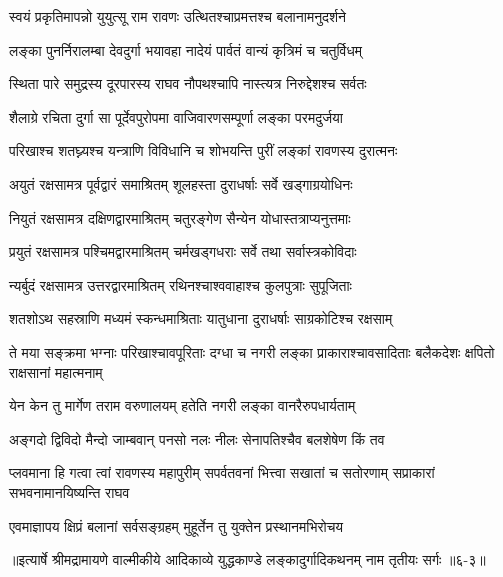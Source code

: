 \twolineshloka
{स्वयं प्रकृतिमापन्नो युयुत्सू राम रावणः}
{उत्थितश्चाप्रमत्तश्च बलानामनुदर्शने} %

\twolineshloka
{लङ्का पुनर्निरालम्बा देवदुर्गा भयावहा}
{नादेयं पार्वतं वान्यं कृत्रिमं च चतुर्विधम्} %

\twolineshloka
{स्थिता पारे समुद्रस्य दूरपारस्य राघव}
{नौपथश्चापि नास्त्यत्र निरुद्देशश्च सर्वतः} %

\twolineshloka
{शैलाग्रे रचिता दुर्गा सा पूर्देवपुरोपमा}
{वाजिवारणसम्पूर्णा लङ्का परमदुर्जया} %

\twolineshloka
{परिखाश्च शतघ्न्यश्च यन्त्राणि विविधानि च}
{शोभयन्ति पुरीं लङ्कां रावणस्य दुरात्मनः} %

\twolineshloka
{अयुतं रक्षसामत्र पूर्वद्वारं समाश्रितम्}
{शूलहस्ता दुराधर्षाः सर्वे खड्गाग्रयोधिनः} %

\twolineshloka
{नियुतं रक्षसामत्र दक्षिणद्वारमाश्रितम्}
{चतुरङ्गेण सैन्येन योधास्तत्राप्यनुत्तमाः} %

\twolineshloka
{प्रयुतं रक्षसामत्र पश्चिमद्वारमाश्रितम्}
{चर्मखड्गधराः सर्वे तथा सर्वास्त्रकोविदाः} %

\twolineshloka
{न्यर्बुदं रक्षसामत्र उत्तरद्वारमाश्रितम्}
{रथिनश्चाश्ववाहाश्च कुलपुत्राः सुपूजिताः} %

\twolineshloka
{शतशोऽथ सहस्राणि मध्यमं स्कन्धमाश्रिताः}
{यातुधाना दुराधर्षाः साग्रकोटिश्च रक्षसाम्} %

\threelineshloka
{ते मया सङ्क्रमा भग्नाः परिखाश्चावपूरिताः}
{दग्धा च नगरी लङ्का प्राकाराश्चावसादिताः}
{बलैकदेशः क्षपितो राक्षसानां महात्मनाम्} %

\twolineshloka
{येन केन तु मार्गेण तराम वरुणालयम्}
{हतेति नगरी लङ्का वानरैरुपधार्यताम्} %

\twolineshloka
{अङ्गदो द्विविदो मैन्दो जाम्बवान् पनसो नलः}
{नीलः सेनापतिश्चैव बलशेषेण किं तव} %

\threelineshloka
{प्लवमाना हि गत्वा त्वां रावणस्य महापुरीम्}
{सपर्वतवनां भित्त्वा सखातां च सतोरणाम्}
{सप्राकारां सभवनामानयिष्यन्ति राघव} %

\twolineshloka
{एवमाज्ञापय क्षिप्रं बलानां सर्वसङ्ग्रहम्}
{मुहूर्तेन तु युक्तेन प्रस्थानमभिरोचय} %


॥इत्यार्षे श्रीमद्रामायणे वाल्मीकीये आदिकाव्ये युद्धकाण्डे लङ्कादुर्गादिकथनम् नाम तृतीयः सर्गः ॥६-३॥
